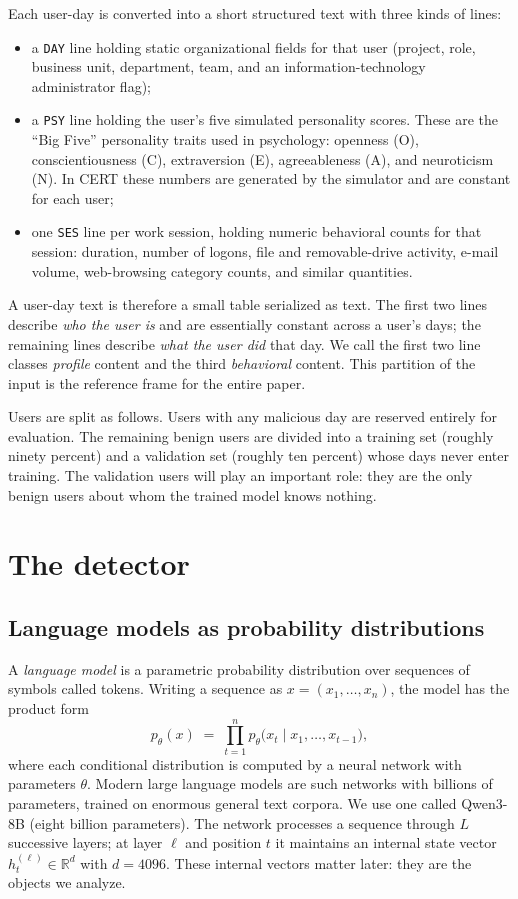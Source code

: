 \documentclass[10pt]{article}
\begin{document}
Each user-day is converted into a short structured text with three
kinds of lines:
\begin{itemize}
\item a \texttt{DAY} line holding static organizational fields for that
user (project, role, business unit, department, team, and an
information-technology administrator flag);
\item a \texttt{PSY} line holding the user's five simulated personality
scores. These are the ``Big Five'' personality traits used in
psychology: openness (O), conscientiousness (C), extraversion (E),
agreeableness (A), and neuroticism (N). In CERT these numbers are
generated by the simulator and are constant for each user;
\item one \texttt{SES} line per work session, holding numeric
behavioral counts for that session: duration, number of logons, file
and removable-drive activity, e-mail volume, web-browsing category
counts, and similar quantities.
\end{itemize}
A user-day text is therefore a small table serialized as text. The
first two lines describe \emph{who the user is} and are essentially
constant across a user's days; the remaining lines describe \emph{what
the user did} that day. We call the first two line classes
\emph{profile} content and the third \emph{behavioral} content. This
partition of the input is the reference frame for the entire paper.

Users are split as follows. Users with any malicious day are reserved
entirely for evaluation. The remaining benign users are divided into a
training set (roughly ninety percent) and a validation set (roughly ten
percent) whose days never enter training. The validation users will
play an important role: they are the only benign users about whom the
trained model knows nothing.

\section{The detector}
\label{sec:detector}

\subsection{Language models as probability distributions}

A \emph{language model} is a parametric probability distribution over
sequences of symbols called tokens. Writing a sequence as
$x = (x_1, \dots, x_n)$, the model has the product form
\begin{equation}
p_\theta(x) \;=\; \prod_{t=1}^{n} p_\theta\bigl(x_t \mid x_1, \dots,
x_{t-1}\bigr),
\end{equation}
where each conditional distribution is computed by a neural network
with parameters $\theta$. Modern large language models are such
networks with billions of parameters, trained on enormous general text
corpora. We use one called Qwen3-8B (eight billion parameters). The
network processes a sequence through $L$ successive layers; at layer
$\ell$ and position $t$ it maintains an internal state vector
$h^{(\ell)}_t \in \mathbb{R}^{d}$ with $d = 4096$. These internal
vectors matter later: they are the objects we analyze.
\end{document}
